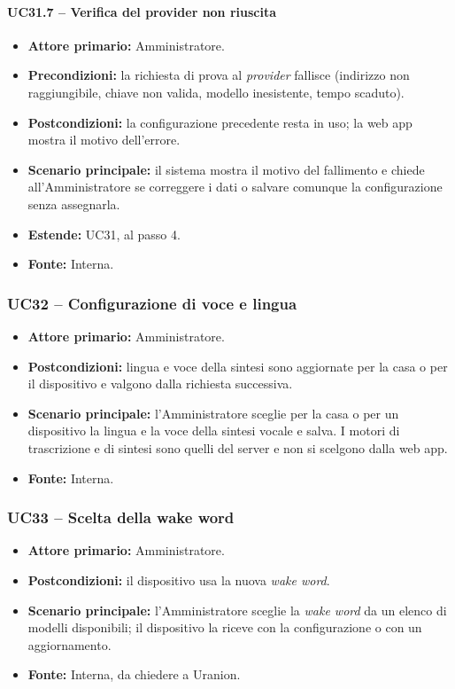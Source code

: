\documentclass[12pt,a4paper]{article}
\newcommand{\tightlist}{\setlength{\itemsep}{1pt}\setlength{\parskip}{0pt}}
\begin{document}
\paragraph{UC31.7 -- Verifica del provider non riuscita}
\begin{itemize}
\tightlist
\item \textbf{Attore primario:} Amministratore.
\item \textbf{Precondizioni:} la richiesta di prova al \emph{provider} fallisce (indirizzo non raggiungibile, chiave non valida, modello inesistente, tempo scaduto).
\item \textbf{Postcondizioni:} la configurazione precedente resta in uso; la web app mostra il motivo dell'errore.
\item \textbf{Scenario principale:} il sistema mostra il motivo del fallimento e chiede all'Amministratore se correggere i dati o salvare comunque la configurazione senza assegnarla.
\item \textbf{Estende:} UC31, al passo 4.
\item \textbf{Fonte:} Interna.
\end{itemize}

\subsubsection{UC32 -- Configurazione di voce e lingua}
\begin{itemize}
\tightlist
\item \textbf{Attore primario:} Amministratore.
\item \textbf{Postcondizioni:} lingua e voce della sintesi sono aggiornate per la casa o per il dispositivo e valgono dalla richiesta successiva.
\item \textbf{Scenario principale:} l'Amministratore sceglie per la casa o per un dispositivo la lingua e la voce della sintesi vocale e salva. I motori di trascrizione e di sintesi sono quelli del server e non si scelgono dalla web app.
\item \textbf{Fonte:} Interna.
\end{itemize}

\subsubsection{UC33 -- Scelta della wake word}
\begin{itemize}
\tightlist
\item \textbf{Attore primario:} Amministratore.
\item \textbf{Postcondizioni:} il dispositivo usa la nuova \emph{wake word}.
\item \textbf{Scenario principale:} l'Amministratore sceglie la \emph{wake word} da un elenco di modelli disponibili; il dispositivo la riceve con la configurazione o con un aggiornamento.
\item \textbf{Fonte:} Interna, da chiedere a Uranion.
\end{itemize}
\end{document}
